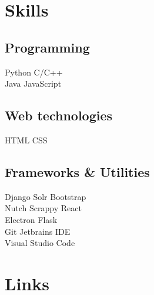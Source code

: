 \documentclass[a4paper]{deedy-resume-openfont}
\begin{document}
\begin{minipage}[t]{0.36\textwidth}

\section{Skills}
\subsection{Programming}
\textbullet{} Python \textbullet{} C/C++ \\
\textbullet{} Java \textbullet{} JavaScript \\
\sectionsep
\subsection{Web technologies}
\textbullet{} HTML \textbullet{} CSS \\
\sectionsep
\subsection{Frameworks \& Utilities}
\textbullet{} Django \textbullet{} Solr \textbullet{} Bootstrap \\
\textbullet{} Nutch \textbullet{} Scrappy \textbullet{} React \\
\textbullet{} Electron \textbullet{} Flask \\
\textbullet{} Git \textbullet{} Jetbrains IDE \\ 
\textbullet{} Visual Studio Code
\sectionsep

\section{Links} 
\sectionsep

\end{minipage} 
\end{document}
